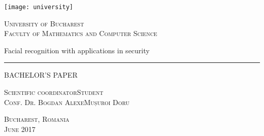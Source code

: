 \begin{titlepage}
	\begin{center}

		\texttt{[image: university]}

		\vspace{0.5cm}
		\LARGE \textsc{University of Bucharest}
		\\
		\vspace{0.5cm}
		\Large \textsc{Faculty of Mathematics and Computer Science}

		\vfill

		\Huge Facial recognition with applications in security
		\rule{\textwidth}{1pt}
		\Large BACHELOR'S PAPER

		\vfill

		\Large
		\textsc{Scientific coordinator}\hfill \textsc{Student}
		\\
		\large
		\textsc{Conf. Dr. Bogdan Alexe}\hfill \textsc{Mușuroi Doru}
	
		\vspace{1.5cm}
		\textsc{Bucharest, Romania}\\
		\textsc{June 2017}

	\end{center}
\end{titlepage}
 

